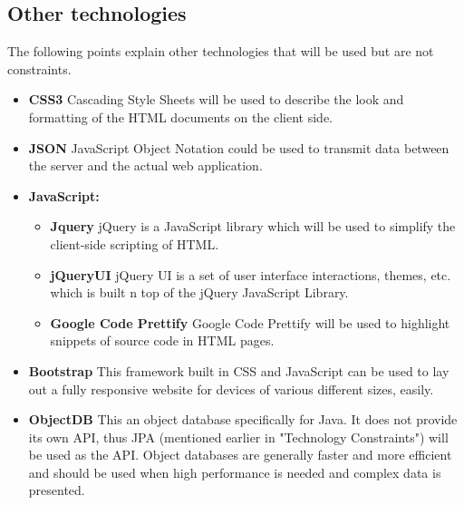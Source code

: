 \subsection{Other technologies}

The following points explain other technologies that will be used but are not constraints. 
\begin{itemize}
	\item{\textbf{CSS3}} \newline
	Cascading Style Sheets will be used to describe the look and formatting of the HTML documents on the client side.
	
	\item{\textbf{JSON}} \newline
	JavaScript Object Notation could be used to transmit data between the server and the actual web application.
	
	\item{\textbf{JavaScript:}}
		\begin{itemize}
			\item{\textbf{Jquery}}
			\newline
			jQuery is a JavaScript library which will be used to simplify the client-side scripting of HTML.
			\item{\textbf{jQueryUI}}
			\newline
			jQuery UI is a set of user interface interactions, themes, etc. which is built n top of the jQuery JavaScript Library.
			\item{\textbf{Google Code Prettify}}
			\newline
			Google Code Prettify will be used to highlight snippets of source code in HTML pages.
		\end{itemize}
	
	\item{\textbf{Bootstrap}}		
	\newline
	This framework built in CSS and JavaScript can be used to lay out a fully responsive website for devices of various different sizes, easily. 

	\item{\textbf{ObjectDB}}
	\newline
	This an object database specifically for Java. It does not provide its own API, thus JPA (mentioned earlier in "Technology Constraints") will be used as the API. Object databases are generally faster and more efficient and should be used when high performance is needed and complex data is presented.
\end{itemize}







